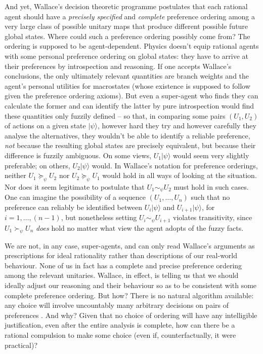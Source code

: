 \documentclass[aps,
pra,epsfig,12pt]{revtex4}
\def\ket#1{| #1\rangle}
\begin{document}
And yet, Wallace's decision theoretic programme postulates
that each rational agent should have a {\it precisely specified} 
and {\it complete}
preference ordering among a very large class of
possible unitary maps that produce different possible 
future global states.  Where could such
a preference ordering possibly come from?  
The ordering is supposed to be agent-dependent.  Physics doesn't equip rational
agents with some personal preference ordering on global states: they
have to arrive at their preferences by introspection and reasoning.
If one accepts Wallace's conclusions, the only ultimately relevant
quantities are branch weights and the agent's personal utilities for 
macrostates (whose existence is supposed to follow given the preference
ordering axioms).
But even a super-agent who finds they can calculate the former and can
identify the latter by pure introspection would find these quantities 
only fuzzily defined -- so that, in comparing
some pairs $( U_1 , U_2 )$ of actions on a given state $\ket{ \psi }$, 
however hard they try and however carefully they analyse the alternatives, 
they wouldn't be able to identify a reliable preference, {\it not}
because the resulting global states are precisely equivalent, but 
because their difference is fuzzily ambiguous.
On some views, $U_1 \ket{ \psi }$ would seem very slightly preferable;
on others, $U_2 \ket{ \psi }$ would.  
In Wallace's notation \cite{wallacevolone} for preference orderings, 
neither $U_1 \succeq_{\psi} U_2$ nor $U_2 \succeq_{\psi} U_1$ would hold in all
ways of looking at the situation.  
Nor does it seem legitimate to postulate that $ U_1 \sim_{\psi} U_2 $ 
must hold in such cases.  One can imagine the possibility
of a sequence $( U_1 , \ldots , U_n )$ such that no 
preference can reliably be identified
between $U_i \ket {\psi }$ and $U_{i+1} \ket{\psi}$, for $i=1 , \ldots, (n-1)$,
but nonetheless setting $U_i \sim_{\psi} U_{i+1}$ violates transitivity,
since $U_1  \succ_{\psi} U_n $ {\it does} hold no matter what 
view the agent adopts of the fuzzy facts.   

We are not, in any case, super-agents, and
can only read Wallace's arguments as prescriptions
for ideal rationality rather than descriptions of our real-world behaviour.
None of us in fact has a complete and precise preference 
ordering among the relevant unitaries.   Wallace, in effect,
is telling us that we should ideally adjust our
reasoning and their behaviour so as to be consistent with 
some complete preference ordering.   But how?  There is no 
natural algorithm available: any choice will involve uncountably
many arbitrary decisions on pairs of preferences \cite{savageworry}.   
And why?  Given that no 
choice of ordering will have any intelligible justification, 
even after the entire analysis is complete, how can there 
be a rational compulsion to make some choice (even if, 
counterfactually, it were practical)?
\end{document}
